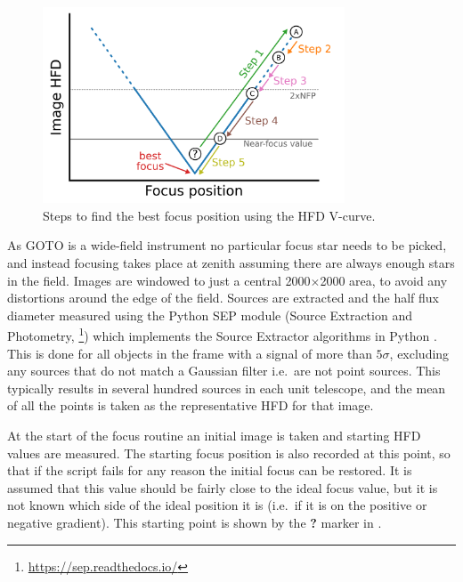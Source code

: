 \begin{colsection}
\begin{colsection}
\begin{figure}[t]
    \begin{center}
        \includegraphics[width=0.8\textwidth]{images/autofocus.pdf}
    \end{center}
    \caption[Steps to find the best focus position using the HFD V-curve]{
        Steps to find the best focus position using the HFD V-curve.
    }\label{fig:autofocus}
\end{figure}

As GOTO is a wide-field instrument no particular focus star needs to be picked, and instead focusing takes place at zenith assuming there are always enough stars in the field. Images are windowed to just a central 2000$\times$2000 area, to avoid any distortions around the edge of the field. Sources are extracted and the half flux diameter measured using the Python SEP module (Source Extraction and Photometry, \footnote{\url{https://sep.readthedocs.io/}}) which implements the Source Extractor algorithms in Python \citep{SE}. This is done for all objects in the frame with a signal of more than $5\sigma$, excluding any sources that do not match a Gaussian filter i.e.\ are not point sources. This typically results in several hundred sources in each unit telescope, and the mean of all the points is taken as the representative HFD for that image.

At the start of the focus routine an initial image is taken and starting HFD values are measured. The starting focus position is also recorded at this point, so that if the script fails for any reason the initial focus can be restored. It is assumed that this value should be fairly close to the ideal focus value, but it is not known which side of the ideal position it is (i.e.\ if it is on the positive or negative gradient). This starting point is shown by the \textbf{?} marker in .


\end{colsection}
\end{colsection}
